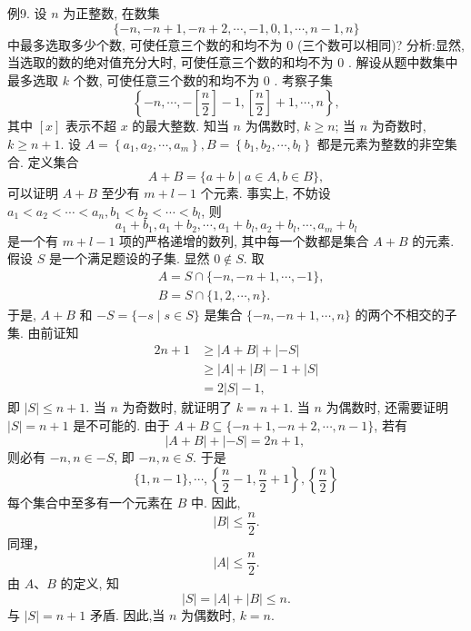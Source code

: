 例9. 设 $n$ 为正整数, 在数集
$$
\{-n,-n+1,-n+2, \cdots,-1,0,1, \cdots, n-1, n\}
$$
中最多选取多少个数, 可使任意三个数的和均不为 0 (三个数可以相同)?
分析:显然, 当选取的数的绝对值充分大时, 可使任意三个数的和均不为 0 .
解设从题中数集中最多选取 $k$ 个数, 可使任意三个数的和均不为 0 . 考察子集
$$
\left\{-n, \cdots,-\left[\frac{n}{2}\right]-1,\left[\frac{n}{2}\right]+1, \cdots, n\right\},
$$
其中 $[x]$ 表示不超 $x$ 的最大整数.
知当 $n$ 为偶数时, $k \geqslant n$; 当 $n$ 为奇数时, $k \geqslant n+1$.
设 $A=\left\{a_1, a_2, \cdots, a_m\right\}, B=\left\{b_1, b_2, \cdots, b_l\right\}$ 都是元素为整数的非空集合.
定义集合
$$
A+B=\{a+b \mid a \in A, b \in B\},
$$
可以证明 $A+B$ 至少有 $m+l-1$ 个元素.
事实上, 不妨设 $a_1<a_2<\cdots<a_n, b_1<b_2<\cdots<b_l$, 则
$$
a_1+b_1, a_1+b_2, \cdots, a_1+b_l, a_2+b_l, \cdots, a_m+b_l
$$
是一个有 $m+l-1$ 项的严格递增的数列, 其中每一个数都是集合 $A+B$ 的元素.
假设 $S$ 是一个满足题设的子集.
显然 $0 \notin S$. 取
$$
\begin{aligned}
& A=S \cap\{-n,-n+1, \cdots,-1\}, \\
& B=S \cap\{1,2, \cdots, n\} .
\end{aligned}
$$
于是, $A+B$ 和 $-S=\{-s \mid s \in S\}$ 是集合 $\{-n,-n+1, \cdots, n\}$ 的两个不相交的子集.
由前证知
$$
\begin{aligned}
2 n+1 & \geqslant|A+B|+|-S| \\
& \geqslant|A|+|B|-1+|S| \\
& =2|S|-1,
\end{aligned}
$$
即 $|S| \leqslant n+1$.
当 $n$ 为奇数时, 就证明了 $k=n+1$.
当 $n$ 为偶数时, 还需要证明 $|S|=n+1$ 是不可能的.
由于 $A+B \subseteq\{-n+1,-n+2, \cdots, n-1\}$, 若有
$$
|A+B|+|-S|=2 n+1 \text {, }
$$
则必有 $-n, n \in-S$, 即 $-n, n \in S$. 于是
$$
\{1, n-1\}, \cdots,\left\{\frac{n}{2}-1, \frac{n}{2}+1\right\},\left\{\frac{n}{2}\right\}
$$
每个集合中至多有一个元素在 $B$ 中.
因此,
$$
|B| \leqslant \frac{n}{2} .
$$
同理，
$$
|A| \leqslant \frac{n}{2} .
$$
由 $A 、 B$ 的定义, 知
$$
|S|=|A|+|B| \leqslant n .
$$
与 $|S|=n+1$ 矛盾.
因此,当 $n$ 为偶数时, $k=n$.



